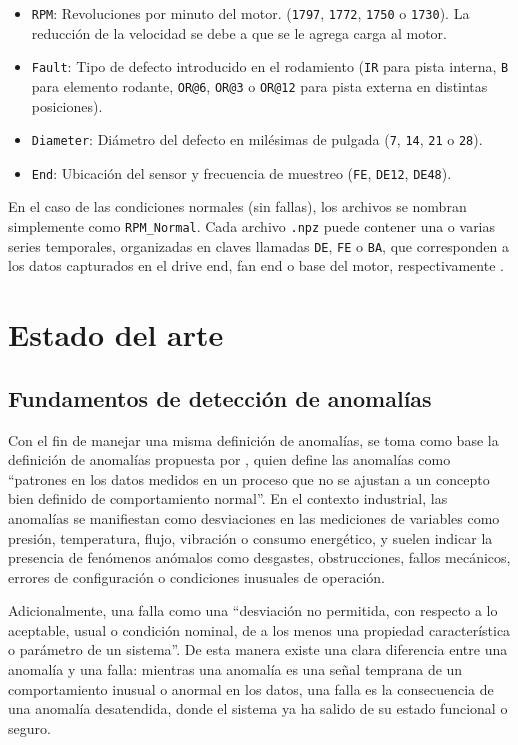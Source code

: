 \documentclass[11pt,a4paper,spanish]{book}
\numberwithin{equation}{chapter}
\numberwithin{figure}{chapter}
\begin{document}
\begin{itemize}
	\item \texttt{RPM}: Revoluciones por minuto del motor. (\texttt{1797}, \texttt{1772}, \texttt{1750} o \texttt{1730}). La reducción de la velocidad se debe a que se le agrega carga al motor.
	\item \texttt{Fault}: Tipo de defecto introducido en el rodamiento (\texttt{IR} para pista interna, \texttt{B} para elemento rodante, \texttt{OR@6}, \texttt{OR@3} o \texttt{OR@12} para pista externa en distintas posiciones).
	\item \texttt{Diameter}: Diámetro del defecto en milésimas de pulgada (\texttt{7}, \texttt{14}, \texttt{21} o \texttt{28}).
	\item \texttt{End}: Ubicación del sensor y frecuencia de muestreo (\texttt{FE}, \texttt{DE12}, \texttt{DE48}).
\end{itemize}


En el caso de las condiciones normales (sin fallas), los archivos se nombran simplemente como \texttt{RPM\_Normal}. 
Cada archivo \texttt{.npz} puede contener una o varias series temporales, organizadas en claves llamadas \texttt{DE}, \texttt{FE} o \texttt{BA}, que corresponden a los datos capturados en el drive end, fan end o base del motor, respectivamente \cite{rigas2024marine}.



\section{Estado del arte}

\subsection{Fundamentos de detección de anomalías}

Con el fin de manejar una misma definición de anomalías, se toma como base la 
definición de anomalías propuesta por \cite{leon2012anomalias}, quien define las 
anomalías como “patrones en los datos medidos en un proceso que no se ajustan a un 
concepto bien definido de comportamiento normal”. 
En el contexto industrial, las anomalías se manifiestan como desviaciones en las 
mediciones de variables como presión, temperatura, flujo, vibración o consumo 
energético, y suelen indicar la presencia de fenómenos anómalos como desgastes, 
obstrucciones, fallos mecánicos, errores de configuración o condiciones inusuales 
de operación.


Adicionalmente, \cite{leon2012anomalias} una falla como una “desviación no 
permitida, con respecto a lo aceptable, usual o condición nominal, de a los 
menos una propiedad característica o parámetro de un sistema”. De esta manera 
existe una clara diferencia entre una anomalía y una falla: mientras una anomalía 
es una señal temprana de un comportamiento inusual o anormal en los datos, una 
falla es la consecuencia de una anomalía desatendida, donde el sistema ya ha 
salido de su estado funcional o seguro. 
\end{document}
